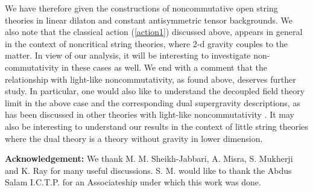 \documentclass[a4paper,12pt]{article}
\begin{document}
We have therefore given the constructions of 
noncommutative open string theories in linear 
dilaton and constant antisymmetric tensor backgrounds.
We also note that the classical action (\ref{action1}) 
discussed above, appears in general in the context of noncritical string 
theories\cite{sasha,marn,das,das2}, where 
2-d gravity couples to the matter. In view of our analysis, it 
will be interesting to investigate non-commutativity in these cases
as well. We end with a comment that the relationship 
with light-like noncommutativity, as found above,   
deserves further study. In particular, one would also like to 
understand the decoupled field theory limit \cite{aharony, jabbari,
chen, cai} in the above case and 
the corresponding dual supergravity descriptions, as has been 
discussed in other theories with light-like noncommutativity 
\cite{alishahiha}.  
It may also be interesting to understand our results in the context of 
little string theories \cite{berkooz} where the dual theory is a 
theory without gravity in lower dimension. 




{\bf Acknowledgement: } We thank M. M. Sheikh-Jabbari, A. Misra,
S. Mukherji and K. Ray for many useful discussions. 
S. M. would like to thank the Abdus Salam I.C.T.P. for an 
Associateship under which this work was done.
\end{document}
